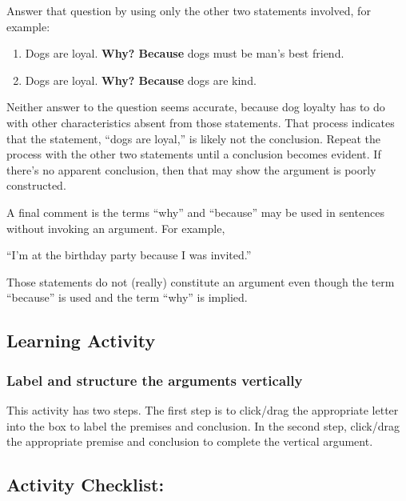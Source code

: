\documentclass[
]{book}
\providecommand{\tightlist}{%
  \setlength{\itemsep}{0pt}\setlength{\parskip}{0pt}}
\begin{document}
Answer that question by using only the other two statements involved, for example:

\begin{enumerate}
\def\labelenumi{\arabic{enumi}.}
\tightlist
\item
  Dogs are loyal. \textbf{Why? Because} dogs must be man's best friend.\\
\item
  Dogs are loyal. \textbf{Why? Because} dogs are kind.
\end{enumerate}

Neither answer to the question seems accurate, because dog loyalty has to do with other characteristics absent from those statements. That process indicates that the statement, ``dogs are loyal,'' is likely not the conclusion. Repeat the process with the other two statements until a conclusion becomes evident. If there's no apparent conclusion, then that may show the argument is poorly constructed.

A final comment is the terms ``why'' and ``because'' may be used in sentences without invoking an argument. For example,

``I'm at the birthday party because I was invited.''

Those statements do not (really) constitute an argument even though the term ``because'' is used and the term ``why'' is implied.

\hypertarget{learning-activity-3}{%
\subsection*{Learning Activity}\label{learning-activity-3}}

\hypertarget{label-and-structure-the-arguments-vertically}{%
\subsubsection*{Label and structure the arguments vertically}\label{label-and-structure-the-arguments-vertically}}

This activity has two steps. The first step is to click/drag the appropriate letter into the box to label the premises and conclusion. In the second step, click/drag the appropriate premise and conclusion to complete the vertical argument.

\hypertarget{activity-checklist-2}{%
\subsection*{Activity Checklist:}\label{activity-checklist-2}}
\end{document}

